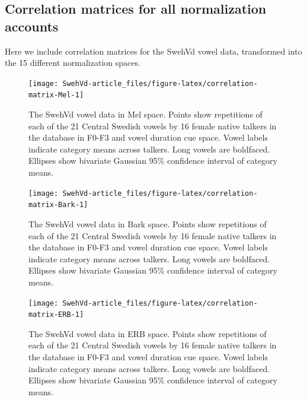 \documentclass[utf8]{frontiersSCNS}
\begin{document}
\hypertarget{sec:correlation-matrices}{%
\subsection*{Correlation matrices for all normalization accounts}\label{sec:correlation-matrices}}

Here we include correlation matrices for the SwehVd vowel data, transformed into the 15 different normalization spaces.

\newpage



\begin{figure}
\texttt{[image: SwehVd-article\_files/figure-latex/correlation-matrix-Mel-1]} \caption{The SwehVd vowel data in Mel space. Points show repetitions of each of the 21 Central Swedish vowels by 16 female native talkers in the database in F0-F3 and vowel duration cue space. Vowel labels indicate category means across talkers. Long vowels are boldfaced. Ellipses show bivariate Gaussian 95\% confidence interval of category means.}\label{fig:correlation-matrix-Mel}
\end{figure}



\begin{figure}
\texttt{[image: SwehVd-article\_files/figure-latex/correlation-matrix-Bark-1]} \caption{The SwehVd vowel data in Bark space. Points show repetitions of each of the 21 Central Swedish vowels by 16 female native talkers in the database in F0-F3 and vowel duration cue space. Vowel labels indicate category means across talkers. Long vowels are boldfaced. Ellipses show bivariate Gaussian 95\% confidence interval of category means.}\label{fig:correlation-matrix-Bark}
\end{figure}



\begin{figure}
\texttt{[image: SwehVd-article\_files/figure-latex/correlation-matrix-ERB-1]} \caption{The SwehVd vowel data in ERB space. Points show repetitions of each of the 21 Central Swedish vowels by 16 female native talkers in the database in F0-F3 and vowel duration cue space. Vowel labels indicate category means across talkers. Long vowels are boldfaced. Ellipses show bivariate Gaussian 95\% confidence interval of category means.}\label{fig:correlation-matrix-ERB}
\end{figure}
\end{document}
